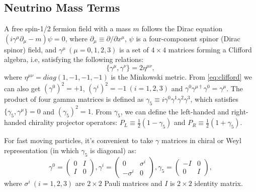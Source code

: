 \subsection{Neutrino Mass Terms}
A free spin-1/2 fermion field with a mass $m$ follows the Dirac equation $(i\gamma^\mu\partial_\mu-m)\psi=0$, where $\partial_\mu\equiv \partial/\partial x^\mu$, $\psi$ is a four-component spinor (Dirac spinor) field, and $\gamma^\mu~(\mu=0,1,2,3)$ is a set of $4\times 4$ matrices forming a Clifford algebra, i.e, satisfying the following relations\cite{akhmedov2014majorana,zee2010quantum}:
\begin{equation}\label{eq:clifford}
\{\gamma^\mu,\gamma^\nu\}=2\eta^{\mu\nu}, 
\end{equation}
where $\eta^{\mu\nu}=diag(1,-1,-1,-1)$ is the Minkowski metric. From \ref{eq:clifford} we can also get $(\gamma^0)^2=+1$, $(\gamma^i)^2=-1~(i=1,2,3)$ and $\gamma^0\gamma^{\mu\dag}\gamma^0=\gamma^\mu$. The product of four gamma matrices is defined as $\gamma_5\equiv i\gamma^0\gamma^1\gamma^2\gamma^3$, which satisfies $\{\gamma_5,\gamma^\mu\}=0$ and $(\gamma_5)^2=1$. From $\gamma_5$, we can define the left-handed and right-handed chirality projector operators: $P_L\equiv\frac{1}{2}(1-\gamma_5)$ and $P_R\equiv\frac{1}{2}(1+\gamma_5)$.

For fast moving particles, it's convenient to take $\gamma$ matrices in chiral or Weyl representation (in which $\gamma_5$ is diagonal) as\cite{zee2010quantum}:
\begin{equation}
\gamma^0 = \begin{pmatrix} 
0 & I \\
I & 0
\end{pmatrix},
\gamma^i = \begin{pmatrix} 
0 & \sigma^i \\
-\sigma^i & 0
\end{pmatrix},
\gamma_5 = \begin{pmatrix} 
-I & 0 \\
0 & I
\end{pmatrix},
\end{equation}
where $\sigma^i~(i=1,2,3)$ are $2\times 2$ Pauli matrices and $I$ is  $2\times 2$ identity matrix.

